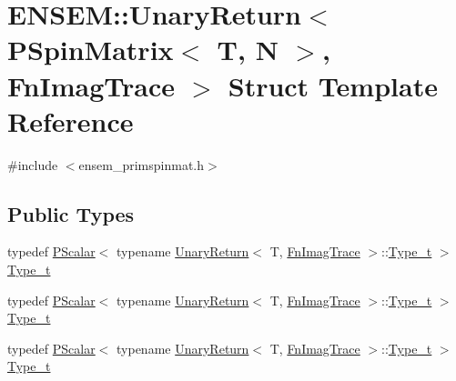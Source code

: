 \hypertarget{structENSEM_1_1UnaryReturn_3_01PSpinMatrix_3_01T_00_01N_01_4_00_01FnImagTrace_01_4}{}\section{E\+N\+S\+EM\+:\+:Unary\+Return$<$ P\+Spin\+Matrix$<$ T, N $>$, Fn\+Imag\+Trace $>$ Struct Template Reference}
\label{structENSEM_1_1UnaryReturn_3_01PSpinMatrix_3_01T_00_01N_01_4_00_01FnImagTrace_01_4}


{\ttfamily \#include $<$ensem\+\_\+primspinmat.\+h$>$}

\subsection*{Public Types}
\begin{DoxyCompactItemize}
\item 
typedef \mbox{\hyperlink{classENSEM_1_1PScalar}{P\+Scalar}}$<$ typename \mbox{\hyperlink{structENSEM_1_1UnaryReturn}{Unary\+Return}}$<$ T, \mbox{\hyperlink{structENSEM_1_1FnImagTrace}{Fn\+Imag\+Trace}} $>$\+::\mbox{\hyperlink{structENSEM_1_1UnaryReturn_3_01PSpinMatrix_3_01T_00_01N_01_4_00_01FnImagTrace_01_4_a00df9fe56fd651d15305a76596a3f23b}{Type\+\_\+t}} $>$ \mbox{\hyperlink{structENSEM_1_1UnaryReturn_3_01PSpinMatrix_3_01T_00_01N_01_4_00_01FnImagTrace_01_4_a00df9fe56fd651d15305a76596a3f23b}{Type\+\_\+t}}
\item 
typedef \mbox{\hyperlink{classENSEM_1_1PScalar}{P\+Scalar}}$<$ typename \mbox{\hyperlink{structENSEM_1_1UnaryReturn}{Unary\+Return}}$<$ T, \mbox{\hyperlink{structENSEM_1_1FnImagTrace}{Fn\+Imag\+Trace}} $>$\+::\mbox{\hyperlink{structENSEM_1_1UnaryReturn_3_01PSpinMatrix_3_01T_00_01N_01_4_00_01FnImagTrace_01_4_a00df9fe56fd651d15305a76596a3f23b}{Type\+\_\+t}} $>$ \mbox{\hyperlink{structENSEM_1_1UnaryReturn_3_01PSpinMatrix_3_01T_00_01N_01_4_00_01FnImagTrace_01_4_a00df9fe56fd651d15305a76596a3f23b}{Type\+\_\+t}}
\item 
typedef \mbox{\hyperlink{classENSEM_1_1PScalar}{P\+Scalar}}$<$ typename \mbox{\hyperlink{structENSEM_1_1UnaryReturn}{Unary\+Return}}$<$ T, \mbox{\hyperlink{structENSEM_1_1FnImagTrace}{Fn\+Imag\+Trace}} $>$\+::\mbox{\hyperlink{structENSEM_1_1UnaryReturn_3_01PSpinMatrix_3_01T_00_01N_01_4_00_01FnImagTrace_01_4_a00df9fe56fd651d15305a76596a3f23b}{Type\+\_\+t}} $>$ \mbox{\hyperlink{structENSEM_1_1UnaryReturn_3_01PSpinMatrix_3_01T_00_01N_01_4_00_01FnImagTrace_01_4_a00df9fe56fd651d15305a76596a3f23b}{Type\+\_\+t}}
\end{DoxyCompactItemize}


